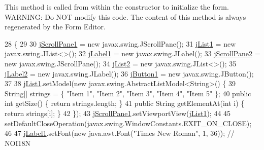This method is called from within the constructor to initialize the form. W\+A\+R\+N\+I\+NG\+: Do N\+OT modify this code. The content of this method is always regenerated by the Form Editor. 
\begin{DoxyCode}
28                                   \{
29 
30         \mbox{\hyperlink{classinterfacessoguar_1_1verplazas_c_u04_a5428b3d2cbdfce05a862d256da2577d5}{jScrollPane1}} = \textcolor{keyword}{new} javax.swing.JScrollPane();
31         \mbox{\hyperlink{classinterfacessoguar_1_1verplazas_c_u04_a6e74d828820b2d45103c85b7fd8e6157}{jList1}} = \textcolor{keyword}{new} javax.swing.JList<>();
32         \mbox{\hyperlink{classinterfacessoguar_1_1verplazas_c_u04_afdbe2344e261b706d86ca4f7a224cd0c}{jLabel1}} = \textcolor{keyword}{new} javax.swing.JLabel();
33         \mbox{\hyperlink{classinterfacessoguar_1_1verplazas_c_u04_a2c437bac63275cca364bd05ee48332e6}{jScrollPane2}} = \textcolor{keyword}{new} javax.swing.JScrollPane();
34         \mbox{\hyperlink{classinterfacessoguar_1_1verplazas_c_u04_a56747d2eed236a05a0369d85176c5ca3}{jList2}} = \textcolor{keyword}{new} javax.swing.JList<>();
35         \mbox{\hyperlink{classinterfacessoguar_1_1verplazas_c_u04_a27d9e05008cd65fbf1961ab5fbff22b0}{jLabel2}} = \textcolor{keyword}{new} javax.swing.JLabel();
36         \mbox{\hyperlink{classinterfacessoguar_1_1verplazas_c_u04_a2711671a6e6008061f70195e1689943e}{jButton1}} = \textcolor{keyword}{new} javax.swing.JButton();
37 
38         \mbox{\hyperlink{classinterfacessoguar_1_1verplazas_c_u04_a6e74d828820b2d45103c85b7fd8e6157}{jList1}}.setModel(\textcolor{keyword}{new} javax.swing.AbstractListModel<String>() \{
39             String[] strings = \{ \textcolor{stringliteral}{"Item 1"}, \textcolor{stringliteral}{"Item 2"}, \textcolor{stringliteral}{"Item 3"}, \textcolor{stringliteral}{"Item 4"}, \textcolor{stringliteral}{"Item 5"} \};
40             \textcolor{keyword}{public} \textcolor{keywordtype}{int} getSize() \{ \textcolor{keywordflow}{return} strings.length; \}
41             \textcolor{keyword}{public} String getElementAt(\textcolor{keywordtype}{int} i) \{ \textcolor{keywordflow}{return} strings[i]; \}
42         \});
43         \mbox{\hyperlink{classinterfacessoguar_1_1verplazas_c_u04_a5428b3d2cbdfce05a862d256da2577d5}{jScrollPane1}}.setViewportView(\mbox{\hyperlink{classinterfacessoguar_1_1verplazas_c_u04_a6e74d828820b2d45103c85b7fd8e6157}{jList1}});
44 
45         setDefaultCloseOperation(javax.swing.WindowConstants.EXIT\_ON\_CLOSE);
46 
47         \mbox{\hyperlink{classinterfacessoguar_1_1verplazas_c_u04_afdbe2344e261b706d86ca4f7a224cd0c}{jLabel1}}.setFont(\textcolor{keyword}{new} java.awt.Font(\textcolor{stringliteral}{"Times New Roman"}, 1, 36)); \textcolor{comment}{// NOI18N}

\end{DoxyCode}
